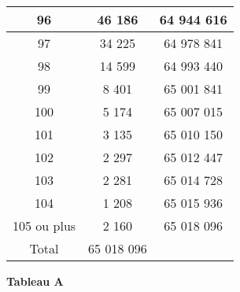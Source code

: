 \begin{center}
\begin{tabular}{|c|c|c|}
          96  &  46 186  &  64 944 616 \\ \hline
          97  &  34 225  &  64 978 841 \\ \hline
          98  &  14 599  &  64 993 440 \\ \hline
          99  &  8 401  &  65 001 841 \\ \hline
          100  &  5 174  &  65 007 015 \\ \hline
          101  &  3 135  &  65 010 150 \\ \hline
          102  &  2 297  &  65 012 447 \\ \hline
          103  &  2 281  &  65 014 728 \\ \hline
          104  &  1 208  &  65 015 936 \\ \hline
          105 ou plus  &  2 160  &  65 018 096 \\ \hline
         Total &  65 018 096 &\\ \hline
     \end{tabular}
     \textbf{Tableau A}
\end{center}


